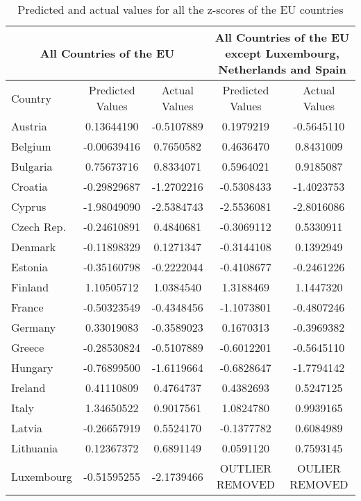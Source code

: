 \documentclass[a4paper, twoside]{report}
\begin{document}
 
\begin{table}[htbp]
  \centering
 \caption{Predicted and actual values for all the z-scores of the EU countries}
   \tabcolsep=0.60cm
	\renewcommand{\arraystretch}{1.3}
	\begin{adjustbox}{max width=\linewidth}
    \begin{tabular}{lcc|cc}
    \multicolumn{3}{c}{All Countries of the EU} & \multicolumn{2}{c}{All Countries of the EU except Luxembourg, Netherlands and Spain} \\
    \midrule
    Country & Predicted Values & Actual Values & Predicted Values & Actual Values \\
    \midrule
    Austria & 0.13644190 & -0.5107889 & 0.1979219 & -0.5645110 \\
    Belgium &  -0.00639416 &  0.7650582 & 0.4636470 & 0.8431009 \\
    Bulgaria & 0.75673716 &  0.8334071 & 0.5964021 & 0.9185087 \\
    Croatia & -0.29829687 & -1.2702216 & -0.5308433 & -1.4023753 \\
    Cyprus & -1.98049090 & -2.5384743 & -2.5536081 & -2.8016086 \\
    Czech Rep. & -0.24610891 & 0.4840681 & -0.3069112 & 0.5330911 \\
    Denmark & -0.11898329 & 0.1271347 & -0.3144108 & 0.1392949 \\
    Estonia & -0.35160798 & -0.2222044 & -0.4108677  & -0.2461226 \\
    Finland & 1.10505712 & 1.0384540 & 1.3188469 & 1.1447320 \\
    France & -0.50323549 & -0.4348456 & -1.1073801 & -0.4807246 \\
    Germany & 0.33019083 & -0.3589023 & 0.1670313 & -0.3969382 \\
    Greece & -0.28530824 & -0.5107889 & -0.6012201 & -0.5645110 \\
    Hungary & -0.76899500 & -1.6119664 & -0.6828647 & -1.7794142 \\
    Ireland & 0.41110809 & 0.4764737 & 0.4382693 & 0.5247125 \\
    Italy & 1.34650522 & 0.9017561 & 1.0824780 & 0.9939165 \\
    Latvia & -0.26657919 & 0.5524170 &  -0.1377782 & 0.6084989 \\
    Lithuania & 0.12367372 & 0.6891149 & 0.0591120 & 0.7593145 \\
    Luxembourg & -0.51595255 & -2.1739466 & OUTLIER REMOVED & OULIER REMOVED \\

\end{tabular}
\end{adjustbox}
\end{table}
\end{document}
